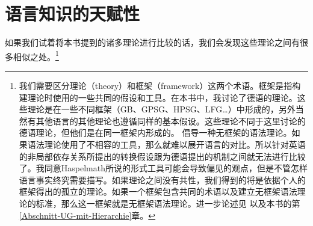 %

\chapter{语言知识的天赋性}
\label{Abschnitt-Angeborenheit}\label{chap-innateness}
%

如果我们试着将本书提到的诸多理论进行比较的话，我们会发现这些理论之间有很多相似之处。\footnote{\label{fn-ffs}%
我们需要区分理论（theory）和框架（framework）这两个术语。框架是指构建理论时使用的一些共同的假设和工具。在本书中，我讨论了德语的理论。这些理论是在一些不同框架（GB、GPSG、HPSG、LFG\ldots）中形成的，另外当然有其他语言的其他理论也遵循同样的基本假设。这些理论不同于这里讨论的德语理论，但他们是在同一框架内形成的。 \citet{Haspelmath2010c}倡导一种无框架的语法理论。如果语法理论使用了不相容的工具，那么就难以展开语言的对比。所以针对英语的非局部依存关系所提出的转换假设跟为德语提出的\slaschc 机制之间就无法进行比较了。我同意Haspelmath所说的形式工具可能会导致偏见的观点，但是不管怎样语言事实终究需要描写。如果理论之间没有共性，我们得到的将是依据个人的框架得出的孤立的理论。如果一个框架包含共同的术语以及建立无框架语法理论的标准，那么这一框架就是无框架语法理论。进一步论述见 \citet{MuellerCoreGram}以及本书的第\ref{Abschnitt-UG-mit-Hierarchie}章。
}
